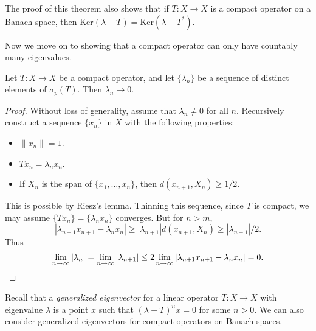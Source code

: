 \begin{remark}
    The proof of this theorem also shows that if $T: X \to X$ is a compact operator on a Banach space, then $\text{Ker}(\lambda - T) = \text{Ker}(\lambda - T^*)$.
\end{remark}

Now we move on to showing that a compact operator can only have countably many eigenvalues.

\begin{lemma}
    Let $T: X \to X$ be a compact operator, and let $\{ \lambda_n \}$ be a sequence of distinct elements of $\sigma_p(T)$. Then $\lambda_n \to 0$.
\end{lemma}
\begin{proof}
    Without loss of generality, assume that $\lambda_n \neq 0$ for all $n$. Recursively construct a sequence $\{ x_n \}$ in $X$ with the following properties:
    \begin{itemize}
        \item $\| x_n \| = 1$.
        \item $Tx_n = \lambda_n x_n$.
        \item If $X_n$ is the span of $\{ x_1, \dots, x_n \}$, then $d(x_{n+1},X_n) \geq 1/2$.
    \end{itemize}
    This is possible by Riesz's lemma. Thinning this sequence, since $T$ is compact, we may assume $\{ Tx_n \} = \{ \lambda_n x_n \}$ converges. But for $n > m$,
    \[ |\lambda_{n+1} x_{n+1} - \lambda_n x_n | \geq |\lambda_{n+1}| d(x_{n+1},X_n) \geq |\lambda_{n+1}|/2. \]
    Thus
    \[ \lim_{n \to \infty} |\lambda_n| = \lim_{n \to \infty} |\lambda_{n+1}| \leq 2 \lim_{n \to \infty} |\lambda_{n+1} x_{n+1} - \lambda_n x_n| = 0. \qedhere \]
\end{proof}

Recall that a \emph{generalized eigenvector} for a linear operator $T: X \to X$ with eigenvalue $\lambda$ is a point $x$ such that $(\lambda - T)^n x = 0$ for some $n > 0$. We can also consider generalized eigenvectors for compact operators on Banach spaces.

